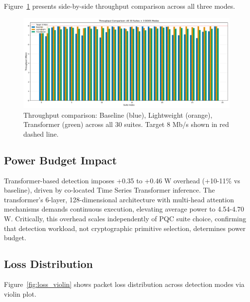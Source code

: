 \documentclass[11pt,a4paper]{article}
\begin{document}
Figure~\ref{fig:throughput_comparison} presents side-by-side throughput comparison across all three modes.

\begin{figure}[H]
\centering
\includegraphics[width=\textwidth]{../figures/figure04_throughput_comparison_grouped.png}
\caption{Throughput comparison: Baseline (blue), Lightweight (orange), Transformer (green) across all 30 suites. Target 8 Mb/s shown in red dashed line.}
\label{fig:throughput_comparison}
\end{figure}

\subsection{Power Budget Impact}

Transformer-based detection imposes +0.35 to +0.46 W overhead (+10-11\% vs baseline), driven by co-located Time Series Transformer inference. The transformer's 6-layer, 128-dimensional architecture with multi-head attention mechanisms demands continuous execution, elevating average power to 4.54-4.70 W. Critically, this overhead scales independently of PQC suite choice, confirming that detection workload, not cryptographic primitive selection, determines power budget.

\subsection{Loss Distribution}

Figure~\ref{fig:loss_violin} shows packet loss distribution across detection modes via violin plot.
\end{document}

